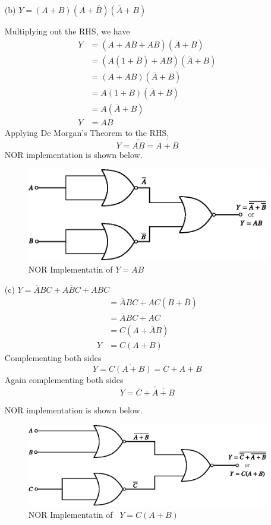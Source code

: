 \begin{solution}
\begin{itemize}
\item[(b)] $Y=(A+B)(A+\overline{B})(\overline{A}+B)$

Multiplying out the RHS, we have
\begin{align*}
Y &= (A+A\overline{B}+AB)(\overline{A}+B)\\[6pt]
  &= (A(1+\overline{B})+AB)(\overline{A}+B)\\[6pt]
  &= (A+AB)(\overline{A}+B)\\[6pt]
  &= A(1+B)(\overline{A}+B)\\[6pt]
  &= A(\overline{A}+B)\\[6pt]
Y &= AB
\end{align*}
Applying De Morgan's Theorem to the RHS,
$$
Y=\overline{\overline{AB}}=\overline{\overline{A}+\overline{B}}
$$
NOR implementation is shown below.
\begin{figure}[H]
\centering
\includegraphics{chap6/fig117.eps}
\bigskip
\caption*{NOR Implementatin of $Y=AB$}
\end{figure}

\item[(c)] $Y=\overline{A}BC+A\overline{B}C+ABC$
\begin{align*}
&= \overline{A}BC+AC(B+\overline{B})\\[5pt]
&= \overline{A}BC+AC\qquad\\[5pt]
&= C(A+\overline{A}B)\\[5pt]
Y &= C(A+B)
\end{align*}
Complementing both sides
$$
\overline{Y}=\overline{C(A+B)}=\overline{C}+\overline{A+B}
$$
Again complementing both sides
$$
Y=\overline{\overline{C}+\overline{A+B}}
$$

\eject

\noindent
NOR implementation is shown below.
\begin{figure}[H]
\centering
\includegraphics{chap6/fig118.eps}
\bigskip
\caption*{NOR Implementatin of~ $Y=C(A+B)$}
\end{figure}
\end{itemize}
\vskip -1cm
\end{solution}

